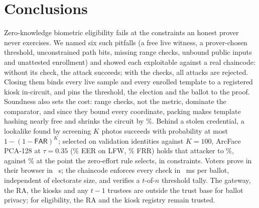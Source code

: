 \documentclass[10pt,letterpaper,journal]{IEEEtran}
\begin{document}
\section{Conclusions}
\label{sec:conclusions}
Zero-knowledge biometric eligibility fails at the constraints an honest prover never exercises. We named six such pitfalls (a free live witness, a prover-chosen threshold, unconstrained path bits, missing range checks, unbound public inputs and unattested enrollment) and showed each exploitable against a real chaincode: without its check, the attack succeeds; with the checks, all \nAttacks{} attacks are rejected. Closing them binds every live sample and every enrolled template to a registered kiosk in-circuit, and pins the threshold, the election and the ballot to the proof. Soundness also sets the cost: range checks, not the metric, dominate the comparator, and since they bound every coordinate, packing makes template hashing nearly free and shrinks the circuit by \nPackSave\%. Behind a stolen credential, a lookalike found by screening $K$ photos succeeds with probability at most $1-(1-\mathsf{FAR})^K$; selected on validation identities against $K = 100$, ArcFace PCA-128 at $\tau = 0.35$ (\nLfwEer\% EER on LFW, \nFrr\% FRR) holds that attacker to \nLookLfwHundred\%, against \nZeLookLfwHundred\% at the point the zero-effort rule selects, in \nFaceConstraints{} constraints. Voters prove in their browser in \nBrowserClientS~s; the chaincode enforces every check in \nCastVoteMs~ms per ballot, independent of electorate size, and verifies a $t$-of-$n$ threshold tally. The gateway, the RA, the kiosks and any $t-1$ trustees are outside the trust base for ballot privacy; for eligibility, the RA and the kiosk registry remain trusted.



\end{document}
